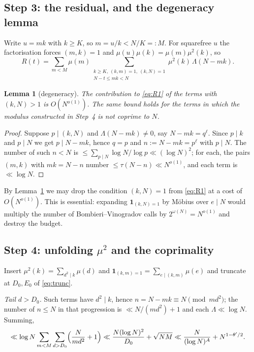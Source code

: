\documentclass[11pt,a4paper]{article}
\theoremstyle{plain}
\newtheorem{lemma}[theorem]{Lemma}
\theoremstyle{definition}
\theoremstyle{remark}
\begin{document}
\subsection{Step 3: the residual, and the degeneracy lemma}

Write $u=mk$ with $k\ge K$, so $m=u/k<N/K=:M$. For squarefree $u$ the
factorisation forces $(m,k)=1$ and $\mu(u)\mu(k)=\mu(m)\mu^2(k)$, so
\begin{equation}\label{eq:R1}
  R(t)=\sum_{m<M}\mu(m)
      \sum_{\substack{k\ge K,\ (k,m)=1,\ (k,N)=1\\ N-t\le mk<N}}
      \mu^2(k)\,\Lambda(N-mk).
\end{equation}

\begin{lemma}[degeneracy]\label{lem:degen}
The contribution to \eqref{eq:R1} of the terms with $(k,N)>1$ is
$O(N^{o(1)})$. The same bound holds for the terms in which the modulus
constructed in Step~4 is not coprime to $N$.
\end{lemma}

\begin{proof}
Suppose $p\mid(k,N)$ and $\Lambda(N-mk)\ne0$, say $N-mk=q^\ell$. Since
$p\mid k$ and $p\mid N$ we get $p\mid N-mk$, hence $q=p$ and
$n:=N-mk=p^\ell$ with $p\mid N$. The number of such $n<N$ is
$\le\sum_{p\mid N}\log N/\log p\ll(\log N)^2$; for each, the pairs
$(m,k)$ with $mk=N-n$ number $\le\tau(N-n)\ll N^{o(1)}$, and each term
is $\ll\log N$.
\end{proof}

By Lemma~\ref{lem:degen} we may drop the condition $(k,N)=1$ from
\eqref{eq:R1} at a cost of $O(N^{o(1)})$. This is essential: expanding
$\mathbf 1_{(k,N)=1}$ by M\"obius over $e\mid N$ would multiply the
number of Bombieri--Vinogradov calls by $2^{\omega(N)}=N^{o(1)}$ and
destroy the budget.

\subsection{Step 4: unfolding \texorpdfstring{$\mu^2$}{mu-squared} and the
coprimality}

Insert $\mu^2(k)=\sum_{d^2\mid k}\mu(d)$ and
$\mathbf 1_{(k,m)=1}=\sum_{e\mid(k,m)}\mu(e)$ and truncate at
$D_0,E_0$ of \eqref{eq:trunc}.

\emph{Tail $d>D_0$.} Such terms have $d^2\mid k$, hence
$n=N-mk\equiv N\pmod{md^2}$; the number of $n\le N$ in that
progression is $\ll N/(md^2)+1$ and each $\Lambda\ll\log N$. Summing,
\[
  \ll\log N\sum_{m<M}\sum_{d>D_0}\Bigl(\frac{N}{md^2}+1\Bigr)
  \ll\frac{N(\log N)^2}{D_0}+\sqrt{NM}
  \ll\frac{N}{(\log N)^{A}}+N^{1-\theta'/2}.
\]
\end{document}
